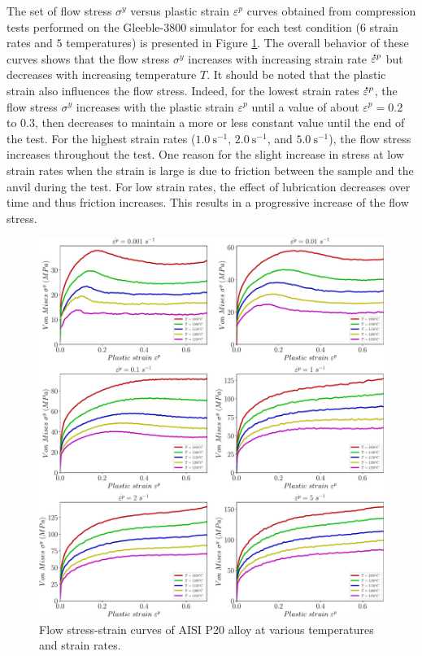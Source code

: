 \documentclass[twoside,english,1p,final,sort&compress]{elsarticle}
\theoremstyle{plain}
\newcommand{\mdot}[1]{\accentset{\mbox{\bfseries .}}{#1}}
\begin{document}
The set of flow stress $\sigma^y$ versus plastic strain $\varepsilon^p$ curves obtained from compression tests performed on the Gleeble-3800 simulator for each test condition ($6$ strain rates and $5$ temperatures) is presented in Figure \ref{fig:rawData}. The overall behavior of these curves shows that the flow stress $\sigma^y$ increases with increasing strain rate $\mdot\varepsilon^p$ but decreases with increasing temperature $T$. It should be noted that the plastic strain also influences the flow stress. Indeed, for the lowest strain rates $\mdot\varepsilon^p$, the flow stress $\sigma^y$ increases with the plastic strain $\varepsilon^p$ until a value of about $\varepsilon^p=0.2$ to $0.3$, then decreases to maintain a more or less constant value until the end of the test. For the highest strain rates ($1.0~\text{s}^{-1}$, $2.0~\text{s}^{-1}$, and $5.0~\text{s}^{-1}$), the flow stress increases throughout the test. One reason for the slight increase in stress at low strain rates when the strain is large is due to friction between the sample and the anvil during the test. For low strain rates, the effect of lubrication decreases over time and thus friction increases. This results in a progressive increase of the flow stress.

\begin{figure}[!ht]
\centering
\includegraphics[width=1.02\columnwidth]
{Figures/rawData}
\caption{Flow stress-strain curves of AISI P20 alloy at various temperatures and strain rates.}
\label{fig:rawData}
\end{figure}
\end{document}
